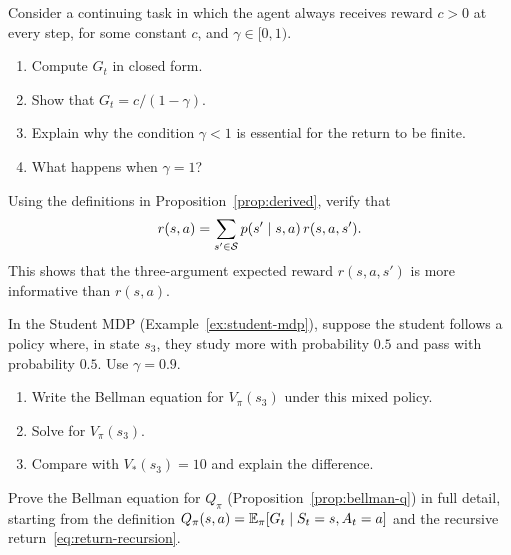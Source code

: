 \begin{exercise}
\label{ex:return-constant}
Consider a continuing task in which the agent always receives reward $c > 0$ at every step, for some constant $c$, and $\gamma \in [0,1)$.
\begin{enumerate}[label=(\alph*)]
  \item Compute $G_t$ in closed form.
  \item Show that $G_t = c/(1-\gamma)$.
  \item Explain why the condition $\gamma < 1$ is essential for the return to be finite.
  \item What happens when $\gamma = 1$?
\end{enumerate}
\end{exercise}

\begin{exercise}
\label{ex:q-from-p}
Using the definitions in Proposition~\ref{prop:derived}, verify that
\[
r(s, a) = \sum_{s' \in \mathcal{S}} p(s' \mid s, a)\, r(s, a, s').
\]
This shows that the three-argument expected reward $r(s,a,s')$ is more informative than $r(s,a)$.
\end{exercise}

\begin{exercise}
\label{ex:action-values-comp}
In the Student MDP (Example~\ref{ex:student-mdp}), suppose the student follows a policy where, in state $s_3$, they study more with probability $0.5$ and pass with probability $0.5$.  Use $\gamma = 0.9$.
\begin{enumerate}[label=(\alph*)]
  \item Write the Bellman equation for $V_\pi(s_3)$ under this mixed policy.
  \item Solve for $V_\pi(s_3)$.
  \item Compare with $V_*(s_3) = 10$ and explain the difference.
\end{enumerate}
\end{exercise}

\begin{exercise}
\label{ex:bellman-q-proof}
Prove the Bellman equation for $Q_\pi$ (Proposition~\ref{prop:bellman-q}) in full detail, starting from the definition $Q_\pi(s,a) = \operatorname{\mathbb{E}}_\pi[G_t \mid S_t = s, A_t = a]$ and the recursive return~\eqref{eq:return-recursion}.
\end{exercise}

